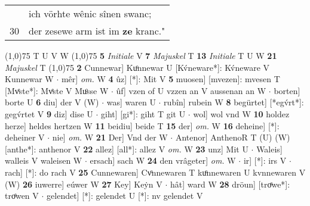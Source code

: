 \documentclass[8pt,a4paper,notitlepage]{article}
\begin{document}
\begin{table}[ht]
\begin{minipage}[t]{0.5\linewidth}
\begin{tabular}{rl}
 & ich vörhte wênic sînen swanc;\\ 
30 & der zesewe arm ist im \textbf{ze} kranc."\\ 
\end{tabular}
\scriptsize
\line(1,0){75} \newline
T U V W \newline
\line(1,0){75} \newline
\textbf{5} \textit{Initiale} V  \textbf{7} \textit{Majuskel} T  \textbf{13} \textit{Initiale} T U W  \textbf{21} \textit{Majuskel} T  \newline
\line(1,0){75} \newline
\textbf{2} Cunnewar] Kuͦnnewar U [Kv́neware*]: Kv́neware V Kunnewar W  $\cdot$ mêr] \textit{om.} W \textbf{4} ûz] [*]: Mit V \textbf{5} muosen] [mvezen]: mvesen T [Mvͤste*]: Mvͤste V Muͦsse W  $\cdot$ ûf] vzen of U vzzen an V aussenan an W  $\cdot$ borten] borte U \textbf{6} diu] der V (W)  $\cdot$ was] waren U  $\cdot$ rubîn] rubein W \textbf{8} begürtet] [*egv́rt*]: gegv́rtet V \textbf{9} diz] dise U  $\cdot$ giht] [gi*]: giht T git U  $\cdot$ wol] wol vnd W \textbf{10} holdez herze] heldes hertzen W \textbf{11} beidiu] beide T \textbf{15} der] \textit{om.} W \textbf{16} deheine] [*]: deheiner V  $\cdot$ nie] \textit{om.} W \textbf{21} Der] Vnd der W  $\cdot$ Antenor] AnthenoR T (U) (W) [anthe*]: anthenor  V \textbf{22} allez] [all*]: allez V \textit{om.} W \textbf{23} unz] Mit U  $\cdot$ Waleis] walleis V waleisen W  $\cdot$ ersach] sach W \textbf{24} den vrâgeter] \textit{om.} W  $\cdot$ ir] [*]: irs V  $\cdot$ rach] [*]: do rach V \textbf{25} Cunnewaren] Cvͦnnewaren T kuͦnnewaren U kvnnewaren V (W) \textbf{26} iuwerre] eúwer W \textbf{27} Key] Keẏn V  $\cdot$ hât] ward W \textbf{28} dröun] [troͤwe*]: troͤwen V  $\cdot$ gelendet] [*]: gelendet U [*]: nv gelendet V \newline
\end{minipage}
\end{table}
\end{document}
